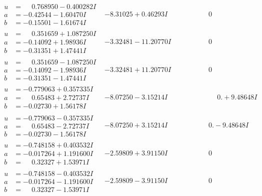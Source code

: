 \documentclass[1p]{elsarticle_modified}
\theoremstyle{definition}
\begin{document}
$$\begin{array}{c|c|c}
\begin{aligned}
u &= \phantom{-}0.768950 - 0.400282 I \\
a &= -0.42544 - 1.60470 I \\
b &= -0.15501 - 1.61674 I\end{aligned}
 & -8.31025 + 0.46293 I & \phantom{-0.000000 } 0 \\ \hline\begin{aligned}
u &= \phantom{-}0.351659 + 1.087250 I \\
a &= -0.14092 + 1.98936 I \\
b &= -0.31351 + 1.47441 I\end{aligned}
 & -3.32481 - 11.20770 I & \phantom{-0.000000 } 0 \\ \hline\begin{aligned}
u &= \phantom{-}0.351659 - 1.087250 I \\
a &= -0.14092 - 1.98936 I \\
b &= -0.31351 - 1.47441 I\end{aligned}
 & -3.32481 + 11.20770 I & \phantom{-0.000000 } 0 \\ \hline\begin{aligned}
u &= -0.779063 + 0.357335 I \\
a &= \phantom{-}0.65483 + 2.72737 I \\
b &= -0.02730 + 1.56178 I\end{aligned}
 & -8.07250 - 3.15214 I & \phantom{-0.000000 -}0. + 9.48648 I \\ \hline\begin{aligned}
u &= -0.779063 - 0.357335 I \\
a &= \phantom{-}0.65483 - 2.72737 I \\
b &= -0.02730 - 1.56178 I\end{aligned}
 & -8.07250 + 3.15214 I & \phantom{-0.000000 } 0. - 9.48648 I \\ \hline\begin{aligned}
u &= -0.748158 + 0.403532 I \\
a &= -0.017264 + 1.191600 I \\
b &= \phantom{-}0.32327 + 1.53971 I\end{aligned}
 & -2.59809 + 3.91150 I & \phantom{-0.000000 } 0 \\ \hline\begin{aligned}
u &= -0.748158 - 0.403532 I \\
a &= -0.017264 - 1.191600 I \\
b &= \phantom{-}0.32327 - 1.53971 I\end{aligned}
 & -2.59809 - 3.91150 I & \phantom{-0.000000 } 0 \\ \hline\begin{aligned}

\end{aligned}
\end{array}$$
\end{document}
